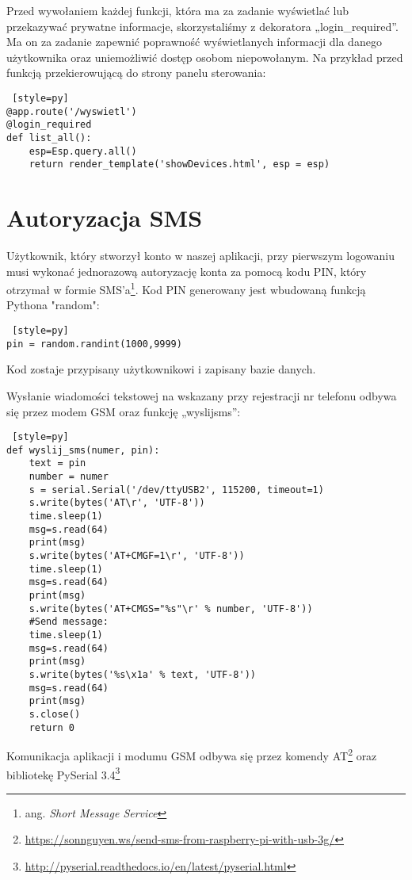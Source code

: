\documentclass{xmgr}
\begin{document}
Przed wywołaniem każdej funkcji, która ma za zadanie wyświetlać lub przekazywać prywatne informacje, skorzystaliśmy z dekoratora „login\_required”. Ma on za zadanie zapewnić poprawność wyświetlanych informacji dla danego użytkownika oraz uniemożliwić dostęp osobom niepowołanym. Na przykład przed funkcją przekierowującą do strony panelu sterowania:

\begin{lstlisting} [style=py] 
@app.route('/wyswietl')
@login_required
def list_all():
    esp=Esp.query.all()
    return render_template('showDevices.html', esp = esp)
\end{lstlisting}

\section{Autoryzacja SMS}
Użytkownik, który stworzył konto w naszej aplikacji, przy pierwszym logowaniu musi wykonać jednorazową autoryzację konta za pomocą kodu PIN, który otrzymał w formie SMS'a\footnote{ang. \emph{Short Message Service}}. Kod PIN generowany jest 
wbudowaną funkcją Pythona "random":
\begin{lstlisting} [style=py] 
pin = random.randint(1000,9999)
\end{lstlisting}
Kod zostaje przypisany użytkownikowi i zapisany bazie danych.

Wysłanie wiadomości tekstowej na wskazany przy rejestracji nr telefonu odbywa się przez modem GSM oraz funkcję „wyslijsms”:
\begin{lstlisting} [style=py] 
def wyslij_sms(numer, pin):
    text = pin
    number = numer
    s = serial.Serial('/dev/ttyUSB2', 115200, timeout=1)
    s.write(bytes('AT\r', 'UTF-8'))
    time.sleep(1)
    msg=s.read(64)
    print(msg)
    s.write(bytes('AT+CMGF=1\r', 'UTF-8'))
    time.sleep(1)
    msg=s.read(64)
    print(msg)
    s.write(bytes('AT+CMGS="%s"\r' % number, 'UTF-8'))
    #Send message:
    time.sleep(1)
    msg=s.read(64)
    print(msg)
    s.write(bytes('%s\x1a' % text, 'UTF-8'))
    msg=s.read(64)
    print(msg)
    s.close()
    return 0
\end{lstlisting}

Komunikacja aplikacji i modumu GSM odbywa się przez komendy AT\footnote{\url{https://sonnguyen.ws/send-sms-from-raspberry-pi-with-usb-3g/}} oraz bibliotekę PySerial 3.4\footnote{\url{http://pyserial.readthedocs.io/en/latest/pyserial.html}}
\end{document}
